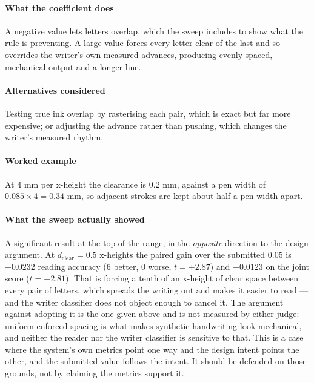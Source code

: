 \paragraph{What the coefficient does}

A negative value lets letters overlap, which the sweep includes to show what the rule is preventing. A large value forces every letter clear of the last and so overrides the writer's own measured advances, producing evenly spaced, mechanical output and a longer line.

\paragraph{Alternatives considered}

Testing true ink overlap by rasterising each pair, which is exact but far more expensive; or adjusting the advance rather than pushing, which changes the writer's measured rhythm.

\paragraph{Worked example}

At $4$ mm per x-height the clearance is $0.2$ mm, against a pen width of $0.085 \times 4 = 0.34$ mm, so adjacent strokes are kept about half a pen width apart.

\paragraph{What the sweep actually showed}

A significant result at the top of the range, in the \emph{opposite} direction to the design argument. At $d_{\text{clear}} = 0.5$ x-heights the paired gain over the submitted $0.05$ is $+0.0232$ reading accuracy ($6$ better, $0$ worse, $t = +2.87$) and $+0.0123$ on the joint score ($t = +2.81$). That is forcing a tenth of an x-height of clear space between every pair of letters, which spreads the writing out and makes it easier to read --- and the writer classifier does not object enough to cancel it. The argument against adopting it is the one given above and is not measured by either judge: uniform enforced spacing is what makes synthetic handwriting look mechanical, and neither the reader nor the writer classifier is sensitive to that. This is a case where the system's own metrics point one way and the design intent points the other, and the submitted value follows the intent. It should be defended on those grounds, not by claiming the metrics support it.

